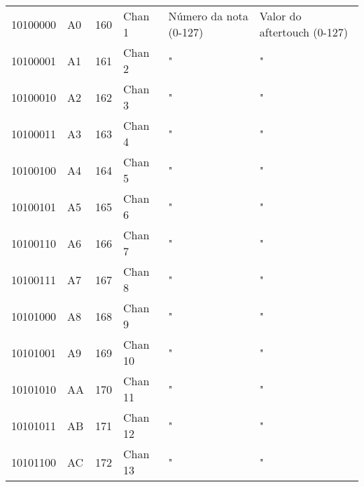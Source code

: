 \begin{center}
{        \label{table:MIDI_polyphonic_Afetertouch}}
        \begin{supertabular}{| C{2cm} | C{1.5cm} | C{1.5cm} | C{5.3cm} | C{1.5cm} | C{1.5cm} |}
             10100000 & A0 & 160 & Chan 1   &         Número da nota (0-127)         &          Valor do aftertouch (0-127)        \\
                10100001 & A1 & 161 & Chan 2   &                   "                    &                    "                        \\
             10100010 & A2 & 162 & Chan 3   &                   "                    &                    "                        \\
                10100011 & A3 & 163 & Chan 4   &                   "                    &                    "                        \\
             10100100 & A4 & 164 & Chan 5   &                   "                    &                    "                        \\
                10100101 & A5 & 165 & Chan 6   &                   "                    &                    "                        \\
             10100110 & A6 & 166 & Chan 7   &                   "                    &                    "                        \\
                10100111 & A7 & 167 & Chan 8   &                   "                    &                    "                        \\
             10101000 & A8 & 168 & Chan 9   &                   "                    &                    "                        \\
                10101001 & A9 & 169 & Chan 10  &                   "                    &                    "                        \\
             10101010 & AA & 170 & Chan 11  &                   "                    &                    "                        \\
                10101011 & AB & 171 & Chan 12  &                   "                    &                    "                        \\
             10101100 & AC & 172 & Chan 13  &                   "                    &                    "                        \\

\end{supertabular}
\end{center}
